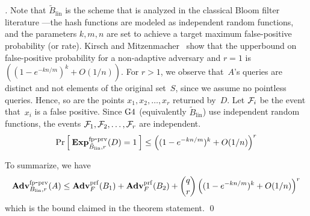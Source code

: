 \begin{proof}[]
Note that $\tilde{B}_{\mathrm{lin}}$ is the scheme that is analyzed in the classical Bloom filter literature ---the hash functions are modeled as independent random functions, and the parameters $k,m,n$  are set to achieve a target maximum false-positive probability (or rate).  Kirsch and Mitzenmacher~\cite{KM} show that the upperbound on false-positive probability for a non-adaptive adversary and $r=1$ is $\left( (1-e^{-kn/m})^k + O(1/n) \right)$.  For $r>1$, we observe that~$A$'s queries are distinct and not elements of the original set~$S$, since we assume no pointless queries. Hence, so are the points $x_1,x_2,\ldots,x_r$ returned by~$D$.  Let ${\cal F}_i$ be the event that~$x_i$ is a false positive.  Since $\text{G4}$ (equivalently $\tilde{B}_{\mathrm{lin}}$) use independent random functions, the events ${\cal F}_1,{\cal F}_2,\ldots,{\cal F}_r$ are independent. 
\[
\Pr\left[\: \mathrm{\mathbf{Exp}}^{\mathrm{fp\mbox{-}prv}}_{\tilde{B}_{\mathrm{lin}},r}(D) = 1 \:\right]\leq \left( (1-e^{-kn/m})^k + O(1/n) \right)^r 
\]

To summarize, we have 
\[
\mathrm{\mathbf{Adv}}^{\mathrm{fp\mbox{-}prv}}_{B_{\mathrm{lin}},r}(A)  \leq  \mathbf{Adv}^{\mathrm{prf}}_{F}(B_1) +\mathbf{Adv}^{\mathrm{prf}}_{F}(B_2) +\dbinom{q}{r}\left( (1-e^{-kn/m})^k + O(1/n) \right)^r
\]
which is the bound claimed in the theorem statement. \hfill \qed


\end{proof}
